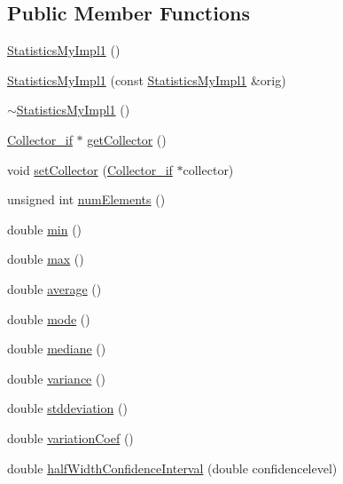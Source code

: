 \subsection*{Public Member Functions}
\begin{DoxyCompactItemize}
\item 
\hyperlink{class_statistics_my_impl1_a74965279c4d06cea81c4f64903a21b74}{Statistics\-My\-Impl1} ()
\item 
\hyperlink{class_statistics_my_impl1_a887576759d5f1d83de788fda0c1efb84}{Statistics\-My\-Impl1} (const \hyperlink{class_statistics_my_impl1}{Statistics\-My\-Impl1} \&orig)
\item 
\hyperlink{class_statistics_my_impl1_abac2ae9a1f5c27467969017fb0bc0298}{$\sim$\-Statistics\-My\-Impl1} ()
\item 
\hyperlink{class_collector__if}{Collector\-\_\-if} $\ast$ \hyperlink{class_statistics_my_impl1_a7c01fbd99fabf6edd4e039c125a6eb3d}{get\-Collector} ()
\item 
void \hyperlink{class_statistics_my_impl1_a220ad0da6ffa6dc237dcd182f35c3221}{set\-Collector} (\hyperlink{class_collector__if}{Collector\-\_\-if} $\ast$collector)
\item 
unsigned int \hyperlink{class_statistics_my_impl1_a2849b72a9be58c379b5a97281082e63a}{num\-Elements} ()
\item 
double \hyperlink{class_statistics_my_impl1_a6342489ef309c427fd2de529e8d27f93}{min} ()
\item 
double \hyperlink{class_statistics_my_impl1_a74d67916a66528d0813ed066788f0010}{max} ()
\item 
double \hyperlink{class_statistics_my_impl1_aed2e463c216a215c23004904c5fdb520}{average} ()
\item 
double \hyperlink{class_statistics_my_impl1_a3bdde1e171fbfac219d8f22e654deb8d}{mode} ()
\item 
double \hyperlink{class_statistics_my_impl1_aa50da1ebb25c6c8fb30b8f4355ac5a89}{mediane} ()
\item 
double \hyperlink{class_statistics_my_impl1_afa5cfa9ad68d31cb2707dbfccf8fb5c5}{variance} ()
\item 
double \hyperlink{class_statistics_my_impl1_ac5bb46f4782920b8be4a297b0ae2bd5e}{stddeviation} ()
\item 
double \hyperlink{class_statistics_my_impl1_abe90460ab3f591c78a60a1924ebe43f5}{variation\-Coef} ()
\item 
double \hyperlink{class_statistics_my_impl1_ac0211d104dab15928738fea6990ccad8}{half\-Width\-Confidence\-Interval} (double confidencelevel)

\end{DoxyCompactItemize}
